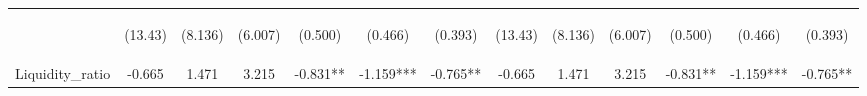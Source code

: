 \documentclass[]{article}
\begin{document}
\begin{center}
\begin{tabular}{lcccccccccccc}
\vspace{4pt} & \begin{footnotesize}(13.43)\end{footnotesize} & \begin{footnotesize}(8.136)\end{footnotesize} & \begin{footnotesize}(6.007)\end{footnotesize} & \begin{footnotesize}(0.500)\end{footnotesize} & \begin{footnotesize}(0.466)\end{footnotesize} & \begin{footnotesize}(0.393)\end{footnotesize} & \begin{footnotesize}(13.43)\end{footnotesize} & \begin{footnotesize}(8.136)\end{footnotesize} & \begin{footnotesize}(6.007)\end{footnotesize} & \begin{footnotesize}(0.500)\end{footnotesize} & \begin{footnotesize}(0.466)\end{footnotesize} & \begin{footnotesize}(0.393)\end{footnotesize} \\
Liquidity\_ratio & -0.665 & 1.471 & 3.215 & -0.831** & -1.159*** & -0.765** & -0.665 & 1.471 & 3.215 & -0.831** & -1.159*** & -0.765** \\

\end{tabular}
\end{center}
\end{document}
